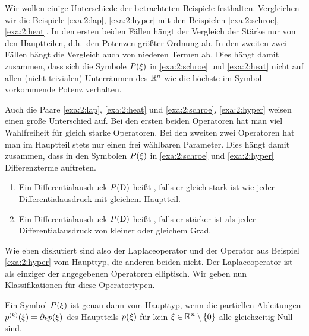 Wir wollen einige Unterschiede der betrachteten Beispiele festhalten.
Vergleichen wir die Beispiele \ref{exa:2:lap}, \ref{exa:2:hyper}
mit den Beispielen \ref{exa:2:schroe}, \ref{exa:2:heat}.
In den ersten beiden Fällen hängt der Vergleich der Stärke nur von den Hauptteilen,
d.h.~den Potenzen größter Ordnung ab.
In den zweiten zwei Fällen hängt die Vergleich auch von niederen Termen ab.
Dies hängt damit zusammen, dass sich die Symbole $P(\xi)$ in
\ref{exa:2:schroe} und \ref{exa:2:heat} nicht auf allen (nicht-trivialen)
Unterräumen des $\mathbb R^n$ wie die höchste im Symbol vorkommende Potenz verhalten.

Auch die Paare \ref{exa:2:lap}, \ref{exa:2:heat}
und \ref{exa:2:schroe}, \ref{exa:2:hyper}
weisen einen große Unterschied auf.
Bei den ersten beiden Operatoren hat man viel Wahlfreiheit
für gleich starke Operatoren.
Bei den zweiten zwei Operatoren hat man im Hauptteil stets
nur einen frei wählbaren Parameter.
Dies hängt damit zusammen, dass in den Symbolen $P(\xi)$
in \ref{exa:2:schroe} und \ref{exa:2:hyper} Differenzterme auftreten.

\begin{df}
\begin{enumerate}
\item
Ein Differentialausdruck $P(\mathrm D)$ heißt ,
falls er gleich stark ist wie jeder Differentialausdruck mit gleichem Hauptteil.
\item
Ein Differentialausdruck $P(\mathrm D)$ heißt ,
falls er stärker ist als jeder Differentialausdruck von kleiner oder gleichem Grad.
\end{enumerate}
\end{df}

Wie eben diskutiert sind also der Laplaceoperator
und der Operator aus Beispiel \ref{exa:2:hyper} vom Haupttyp,
die anderen beiden nicht. Der Laplaceoperator ist als einziger der angegebenen Operatoren elliptisch.
Wir geben nun Klassifikationen für diese Operatortypen.

\begin{thm}\label{thm:2:2.9}
Ein Symbol $P(\xi)$ ist genau dann vom Haupttyp,
wenn die partiellen Ableitungen $p^{(k)}(\xi)=\partial_k p(\xi)$
des Hauptteils $p(\xi)$ für kein $\xi\in\mathbb R^n\setminus\{0\}$
alle gleichzeitig Null sind.
\end{thm}

